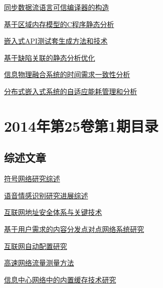 \documentclass[a4paper]{article}
\begin{document}
\href{http://www.jos.org.cn/ch/reader/download_pdf.aspx?file_no=4542&year_id=2014&quarter_id=2&falg=1}{同步数据流语言可信编译器的构造}

\href{http://www.jos.org.cn/ch/reader/download_pdf.aspx?file_no=4532&year_id=2014&quarter_id=2&falg=1}{基于区域内存模型的C程序静态分析}

\href{http://www.jos.org.cn/ch/reader/download_pdf.aspx?file_no=4541&year_id=2014&quarter_id=2&falg=1}{嵌入式API测试套生成方法和技术}

\href{http://www.jos.org.cn/ch/reader/download_pdf.aspx?file_no=4538&year_id=2014&quarter_id=2&falg=1}{基于缺陷关联的静态分析优化}

\href{http://www.jos.org.cn/ch/reader/download_pdf.aspx?file_no=4540&year_id=2014&quarter_id=2&falg=1}{信息物理融合系统的时间需求一致性分析}

\href{http://www.jos.org.cn/ch/reader/download_pdf.aspx?file_no=4536&year_id=2014&quarter_id=2&falg=1}{分布式嵌入式系统的自适应能耗管理和分析}


\section{\textbf{2014年第25卷第1期目录}}
\subsection{综述文章}
\href{http://www.jos.org.cn/ch/reader/download_pdf.aspx?file_no=4503&year_id=2014&quarter_id=1&falg=1}{符号网络研究综述}

\href{http://www.jos.org.cn/ch/reader/download_pdf.aspx?file_no=4497&year_id=2014&quarter_id=1&falg=1}{语音情感识别研究进展综述}

\href{http://www.jos.org.cn/ch/reader/download_pdf.aspx?file_no=4509&year_id=2014&quarter_id=1&falg=1}{互联网地址安全体系与关键技术}

\href{http://www.jos.org.cn/ch/reader/download_pdf.aspx?file_no=4454&year_id=2014&quarter_id=1&falg=1}{基于用户需求的内容分发点对点网络系统研究}

\href{http://www.jos.org.cn/ch/reader/download_pdf.aspx?file_no=4458&year_id=2014&quarter_id=1&falg=1}{互联网自动配置研究}

\href{http://www.jos.org.cn/ch/reader/download_pdf.aspx?file_no=4445&year_id=2014&quarter_id=1&falg=1}{高速网络流量测量方法}

\href{http://www.jos.org.cn/ch/reader/download_pdf.aspx?file_no=4494&year_id=2014&quarter_id=1&falg=1}{信息中心网络中的内置缓存技术研究}
\end{document}
